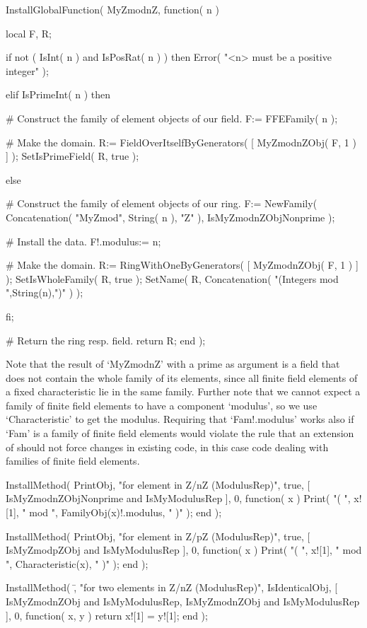 InstallGlobalFunction( MyZmodnZ, function( n )

    local F, R;

    if not ( IsInt( n ) and IsPosRat( n ) ) then
      Error( "<n> must be a positive integer" );

    elif IsPrimeInt( n ) then

      # Construct the family of element objects of our field.
      F:= FFEFamily( n );

      # Make the domain.
      R:= FieldOverItselfByGenerators( [ MyZmodnZObj( F, 1 ) ] );
      SetIsPrimeField( R, true );

    else

      # Construct the family of element objects of our ring.
      F:= NewFamily( Concatenation( "MyZmod", String( n ), "Z" ),
                     IsMyZmodnZObjNonprime );

      # Install the data.
      F!.modulus:= n;

      # Make the domain.
      R:= RingWithOneByGenerators( [ MyZmodnZObj( F, 1 ) ] );
      SetIsWholeFamily( R, true );
      SetName( R, Concatenation( "(Integers mod ",String(n),")" ) );

    fi;

    # Return the ring resp. field.
    return R;
end );
\endtt

Note that the result of `MyZmodnZ' with a prime as argument is a field that
does not contain the whole family of its elements, since all finite field
elements of a fixed characteristic lie in the same family.
Further note that we cannot expect a family of finite field elements
to have a component `modulus',
so we use `Characteristic' to get the modulus.
Requiring that `Fam!.modulus' works also if `Fam' is a family of
finite field elements would violate the rule
that an extension of {\GAP} should not force changes in existing code,
in this case code dealing with families of finite field elements.

\begintt
InstallMethod( PrintObj,
    "for element in Z/nZ (ModulusRep)",
    true,
    [ IsMyZmodnZObjNonprime and IsMyModulusRep ], 0,
    function( x )
    Print( "( ", x![1], " mod ", FamilyObj(x)!.modulus, " )" );
    end );

InstallMethod( PrintObj,
    "for element in Z/pZ (ModulusRep)",
    true,
    [ IsMyZmodpZObj and IsMyModulusRep ], 0,
    function( x )
    Print( "( ", x![1], " mod ", Characteristic(x), " )" );
    end );

InstallMethod( \=,
    "for two elements in Z/nZ (ModulusRep)",
    IsIdenticalObj,
    [ IsMyZmodnZObj and IsMyModulusRep,
      IsMyZmodnZObj and IsMyModulusRep ], 0,
    function( x, y ) return x![1] = y![1]; end );
\endtt

